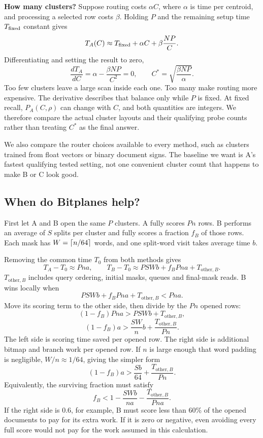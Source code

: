 \textbf{How many clusters?}
Suppose routing costs $\alpha C$, where $\alpha$ is time per centroid, and processing a selected row costs $\beta$. Holding $P$ and the remaining setup time $T_{\rm fixed}$ constant gives
\[
 T_A(C)\approx T_{\rm fixed}+\alpha C+\beta\frac{NP}{C}.
\]
Differentiating and setting the result to zero,
\[
 \frac{dT_A}{dC}=\alpha-\frac{\beta NP}{C^2}=0,
 \qquad \boxed{C^*=\sqrt{\frac{\beta NP}{\alpha}}.}
\]
Too few clusters leave a large scan inside each one. Too many make routing more expensive. The derivative describes that balance only while $P$ is fixed. At fixed recall, $P_A(C,\rho)$ can change with $C$, and both quantities are integers. We therefore compare the actual cluster layouts and their qualifying probe counts rather than treating $C^*$ as the final answer.

We also compare the router choices available to every method, such as clusters trained from float vectors or binary document signs. The baseline we want is A's fastest qualifying tested setting, not one convenient cluster count that happens to make B or C look good.

\subsection{When do Bitplanes help?}
First let A and B open the same $P$ clusters. A fully scores $Pn$ rows. B performs an average of $S$ splits per cluster and fully scores a fraction $f_B$ of those rows. Each mask has $W=\left\lceil n/64\right\rceil$ words, and one split-word visit takes average time $b$.

Removing the common time $T_0$ from both methods gives
\[
 T_A-T_0\approx Pna,
 \qquad
 T_B-T_0\approx PSWb+f_BPna+T_{\mathrm{other},B}.
\]
$T_{\mathrm{other},B}$ includes query ordering, initial masks, queues and final-mask reads. B wins locally when
\[
 PSWb+f_BPna+T_{\mathrm{other},B}<Pna.
\]
Move its scoring term to the other side, then divide by the $Pn$ opened rows:
\[
 (1-f_B)Pna>PSWb+T_{\mathrm{other},B},
\]
\[
 \boxed{(1-f_B)a>\frac{SW}{n}b+
                  \frac{T_{\mathrm{other},B}}{Pn}.}
\]
The left side is scoring time saved per opened row. The right side is additional bitmap and branch work per opened row. If $n$ is large enough that word padding is negligible, $W/n\approx1/64$, giving the simpler form
\[
 (1-f_B)a>\frac{Sb}{64}+\frac{T_{\mathrm{other},B}}{Pn}.
\]
Equivalently, the surviving fraction must satisfy
\[
 \boxed{f_B<1-\frac{SWb}{na}-\frac{T_{\mathrm{other},B}}{Pna}.}
\]
If the right side is 0.6, for example, B must score less than 60\% of the opened documents to pay for its extra work. If it is zero or negative, even avoiding every full score would not pay for the work assumed in this calculation.

